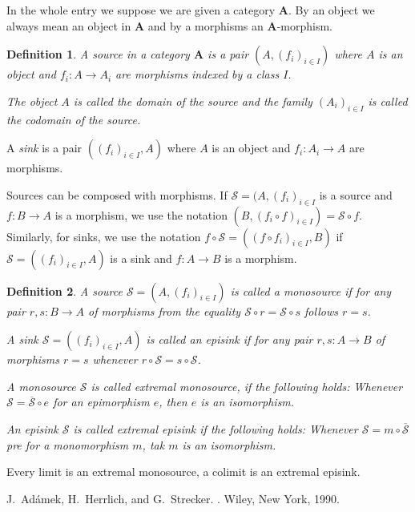 \documentclass[12pt]{article}
\newcommand{\Map}[3]{#1:#2\to#3}
\newcommand{\Kat}[1]{\mathbf{#1}}
\newcommand{\mc}{\mathcal}
\newtheorem{DEF}{Definition}
\begin{document}
In the whole entry we suppose we are given a category $\Kat A$. By an object we always mean an object in $\Kat A$ and by a morphisms an $\Kat A$-morphism.

\begin{DEF}
A \emph{source} in a category $\Kat A$ is a pair $(A,(f_i)_{i\in I})$ where $A$ is an object and $\Map{f_i}A{A_i}$ are morphisms indexed by a class $I$.

The object $A$ is called the \emph{domain of the source} and the family $(A_i)_{i\in I}$ is called the codomain of the source.
\end{DEF}

A \emph{sink} is a pair $((f_i)_{i\in I},A)$ where $A$ is an object and $\Map{f_i}{A_i}A$ are
morphisms.

Sources can be composed with morphisms. If $\mathcal S=(A,(f_i)_{i\in I}$ is a source and
$\Map fBA$ is a morphism, we use the notation $(B,(f_i\circ f)_{i\in I})=\mathcal S\circ f$. 
Similarly, for sinks, we use the notation 
$f\circ\mathcal S=((f\circ f_i)_{i\in I},B)$ if
$\mathcal S=((f_i)_{i\in I}, A)$ is a sink and $\Map fAB$ is a morphism.

\begin{DEF}
A source $\mathcal S=(A,(f_i)_{i\in I})$ is called a \emph{monosource} if for any pair
$\Map{r,s}BA$ of morphisms from the equality $\mathcal S\circ r=\mathcal S\circ s$ follows
$r=s$.

A sink $\mathcal S=((f_i)_{i\in I},A)$ is called an \emph{episink} if for any pair
$\Map{r,s}AB$ of morphisms $r=s$ whenever $r\circ\mathcal S=s\circ\mathcal S$.

A monosource $\mc S$ is called \emph{extremal monosource}, if the following holds: Whenever
$\mathcal S=\overline{\mathcal S}\circ e$ for an epimorphism $e$, then $e$ is an isomorphism.

An episink $\mc S$ is called \emph{extremal episink} if the following holds: Whenever
$\mathcal S=m\circ\overline{\mathcal S}$ pre for a monomorphism $m$, tak $m$ is an isomorphism.
\end{DEF}

Every limit is an extremal monosource, a colimit is an extremal episink.

\begin{thebibliography}{1}

J.~Ad\'amek, H.~Herrlich, and G.~Strecker.
.
\newblock Wiley, New York, 1990.

\end{thebibliography}

\end{document}
